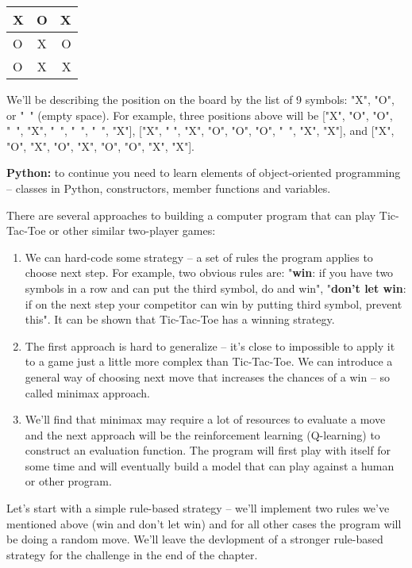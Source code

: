 \begin{center}
\begin{tabular}{ l | c | r }
    X & O & X \\ \hline
    O & X & O \\ \hline
    O & X & X  \\
  \end{tabular}
\end{center}


We'll be describing the position on the board by the list of 9 symbols:
"X", "O", or "\ " (empty space). For example, three positions above will be
["X", "O", "O", "\ ", "X", "\ ", "\ ", "\ ", "X"],
["X", " ", "X", "O", "O", "O", "\ ", "X", "X"], and
["X", "O", "X", "O", "X", "O", "O", "X", "X"].

\begin{tcolorbox}
\textbf{Python:} to continue you need to learn elements of
object-oriented programming -- classes in Python, constructors, member
functions and variables.
\end{tcolorbox}

There are several approaches to building a computer program that can
play Tic-Tac-Toe or other similar two-player games:

\begin{enumerate}
\item We can hard-code some strategy -- a set of rules the program
applies to choose next step. For example, two obvious rules are:
"\textbf{win}: if you have two symbols in a row and
can put the third symbol, do and win",
"\textbf{don't let win}: if on the next step your competitor
can win by putting third symbol, prevent this".
It can be shown that Tic-Tac-Toe has a winning strategy.
\item The first approach is hard to generalize -- it's close to impossible
to apply it to a game
just a little more complex than Tic-Tac-Toe. We can introduce
a general way of choosing next move that increases the chances of
a win -- so called minimax approach.
\item We'll find that minimax may require a lot of resources to evaluate
a move and the next approach will be the reinforcement learning
(Q-learning) to construct an evaluation function. The program
will first play with itself for some time and will eventually build a
model that can play against a human or other program.
\end{enumerate}

Let's start with a simple rule-based strategy -- we'll
implement two rules we've mentioned above (win and don't let win)
and for all other cases the program will be doing a random move.
We'll leave the devlopment of a stronger rule-based strategy for
the challenge in the end of the chapter.

